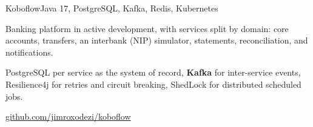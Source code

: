 \begin{cvproject}{Koboflow}{Java 17, PostgreSQL, Kafka, Redis, Kubernetes}
  \item Banking platform in active development, with services split by domain: core accounts, transfers, an interbank (NIP) simulator, statements, reconciliation, and notifications.
  \item PostgreSQL per service as the system of record, \textbf{Kafka} for inter-service events, Resilience4j for retries and circuit breaking, ShedLock for distributed scheduled jobs.
  \item \href{https://github.com/jimroxodezi/koboflow}{github.com/jimroxodezi/koboflow}
\end{cvproject}
